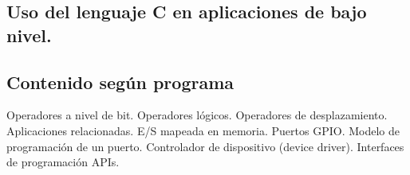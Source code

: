 \setcounter{subsection}{11}
\subsection*{Uso del lenguaje C en aplicaciones de bajo nivel.}
\subsection*{Contenido según programa}
Operadores a nivel de bit. Operadores lógicos. Operadores de desplazamiento. Aplicaciones relacionadas. E/S mapeada en memoria. Puertos GPIO.  Modelo de programación de un puerto. Controlador de dispositivo (device driver). Interfaces de programación APIs.